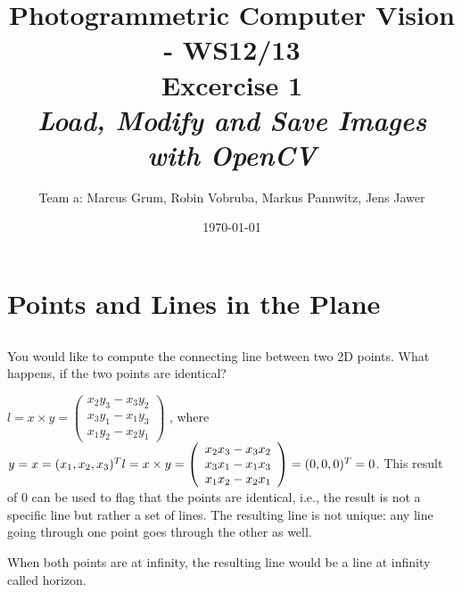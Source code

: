 \documentclass[a4paper,headings=small]{scrartcl}
\title{Photogrammetric Computer Vision - WS12/13 \\ Excercise 1 \\ \emph{Load, Modify and Save Images with OpenCV}}
\author{Team a: Marcus Grum, Robin Vobruba, Markus Pannwitz, Jens Jawer}
\date{\today}
\numberwithin{equation}{section} %
\numberwithin{figure}{section}   %
\begin{document}
\maketitle



\section{Points and Lines in the Plane}


\subsection{}

You would like to compute the connecting line between two 2D points. \newline
What happens, if the two points are identical? \newline


$l=x \times y=
\left( \begin{array}{c}
x_2y_3-x_3y_2\\
x_3y_1-x_1y_3\\
x_1y_2-x_2y_1\end{array} \right)$
, where $y=x=(x_1,x_2,x_3)^T \newline
l=x \times y=
\left( \begin{array}{c}
x_2x_3-x_3x_2\\
x_3x_1-x_1x_3\\
x_1x_2-x_2x_1\end{array} \right)=(0,0, 0)^T=0$. \newline
This result of 0 can be used to flag that the points are identical, i.e., the result
is not a specific line but rather a set of lines. The resulting line is not unique: 
any line going through one point goes through the other as well.

When both points are at infinity, the resulting line would be a line at infinity called horizon.


\subsection{}
\end{document}
